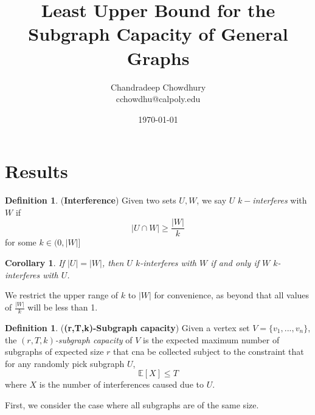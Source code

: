 \documentclass[10pt]{extarticle}
\title{\textbf{Least Upper Bound for the Subgraph Capacity of General Graphs}}
\author{Chandradeep Chowdhury \\ cchowdhu@calpoly.edu}
\date{\today}
\newcommand{\E}{\mathbb{E}}
\newtheorem{corollary}[theorem]{Corollary}
\theoremstyle{definition}
\newtheorem{definition}[theorem]{Definition}
\begin{document}

\section{Results}

\begin{definition}
    (\textbf{Interference}) Given two sets $U, W$, we say $U$ $k-$\textit{interferes} with $W$ if 
    \begin{equation}
        |U \cap W| \ge  \frac{|W|}{k}
    \end{equation}
    for some $k \in (0,|W|]$
\end{definition}

\begin{corollary}
    If $|U| = |W|$, then $U$ $k$-interferes with $W$ if and only if $W$ $k$-interferes with $U$.
\end{corollary}

We restrict the upper range of $k$ to $|W|$ for convenience, as beyond that all values of $\frac{|W|}{k}$ will be less than 1.

\begin{definition} (\textbf{(r,T,k)-Subgraph capacity}) Given a vertex set $V = \{v_1,...,v_n\}$, the \textit{$(r,T,k)$-subgraph capacity} of $V$ is the expected maximum number of subgraphs of expected size $r$ that cna be collected subject to the constraint that for any randomly pick subgraph $U$, 
\begin{equation}
    \E[X] \le T
\end{equation}
where $X$ is the number of interferences caused due to $U$. 
\end{definition}

First, we consider the case where all subgraphs are of the same size.
\end{document}
